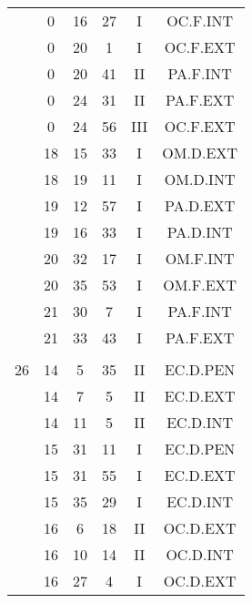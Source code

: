\documentclass[12pt, a4paper]{article}
\begin{document}
\begin{multicols}{3}
{\begin{tabular}{c c c c c c}
	 	 	 	 & 0 & 16 & 27 & I & OC.F.INT\\%
	 	 	 	 & 0 & 20 & 1 & I & OC.F.EXT\\%
	 	 	 	 & 0 & 20 & 41 & II & PA.F.INT\\%
	 	 	 	 & 0 & 24 & 31 & II & PA.F.EXT\\%
	 	 	 	 & 0 & 24 & 56 & III & OC.F.EXT\\%
	 	 	 	 & 18 & 15 & 33 & I & OM.D.EXT\\%
	 	 	 	 & 18 & 19 & 11 & I & OM.D.INT\\%
	 	 	 	 & 19 & 12 & 57 & I & PA.D.EXT\\%
	 	 	 	 & 19 & 16 & 33 & I & PA.D.INT\\%
	 	 	 	 & 20 & 32 & 17 & I & OM.F.INT\\%
	 	 	 	 & 20 & 35 & 53 & I & OM.F.EXT\\%
	 	 	 	 & 21 & 30 & 7 & I & PA.F.INT\\%
	 	 	 	 & 21 & 33 & 43 & I & PA.F.EXT\\%
	 	 	 	 & & & & & \\%
	 	 	 	26 & 14 & 5 & 35 & II & EC.D.PEN\\%
	 	 	 	 & 14 & 7 & 5 & II & EC.D.EXT\\%
	 	 	 	 & 14 & 11 & 5 & II & EC.D.INT\\%
	 	 	 	 & 15 & 31 & 11 & I & EC.D.PEN\\%
	 	 	 	 & 15 & 31 & 55 & I & EC.D.EXT\\%
	 	 	 	 & 15 & 35 & 29 & I & EC.D.INT\\%
	 	 	 	 & 16 & 6 & 18 & II & OC.D.EXT\\%
	 	 	 	 & 16 & 10 & 14 & II & OC.D.INT\\%
	 	 	 	 & 16 & 27 & 4 & I & OC.D.EXT\\%

\end{tabular}}
\end{multicols}
\end{document}
